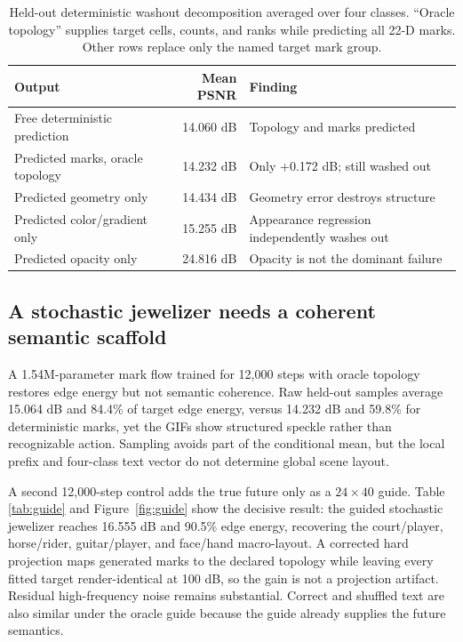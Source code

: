 \documentclass[10pt]{article}
\begin{document}
\begin{table}[H]
\centering
\small
\caption{Held-out deterministic washout decomposition averaged over four classes. ``Oracle
topology'' supplies target cells, counts, and ranks while predicting all 22-D marks. Other rows
replace only the named target mark group.}
\label{tab:washout}
\begin{tabularx}{\linewidth}{@{}XrX@{}}
\toprule
Output & Mean PSNR & Finding \\
\midrule
Free deterministic prediction & 14.060 dB & Topology and marks predicted \\
Predicted marks, oracle topology & 14.232 dB & Only +0.172 dB; still washed out \\
Predicted geometry only & 14.434 dB & Geometry error destroys structure \\
Predicted color/gradient only & 15.255 dB & Appearance regression independently washes out \\
Predicted opacity only & 24.816 dB & Opacity is not the dominant failure \\
\bottomrule
\end{tabularx}
\end{table}

\subsection{A stochastic jewelizer needs a coherent semantic scaffold}

A 1.54M-parameter mark flow trained for 12,000 steps with oracle topology restores edge energy but
not semantic coherence. Raw held-out samples average 15.064 dB and 84.4\% of target edge energy,
versus 14.232 dB and 59.8\% for deterministic marks, yet the GIFs show structured speckle rather
than recognizable action. Sampling avoids part of the conditional mean, but the local prefix and
four-class text vector do not determine global scene layout.

A second 12,000-step control adds the true future only as a \(24\times40\) guide. Table
\ref{tab:guide} and Figure~\ref{fig:guide} show the decisive result: the guided stochastic
jewelizer reaches 16.555 dB and 90.5\% edge energy, recovering the court/player, horse/rider,
guitar/player, and face/hand macro-layout. A corrected hard projection maps generated marks to the
declared topology while leaving every fitted target render-identical at 100 dB, so the gain is not a
projection artifact. Residual high-frequency noise remains substantial. Correct and shuffled text
are also similar under the oracle guide because the guide already supplies the future semantics.
\end{document}
